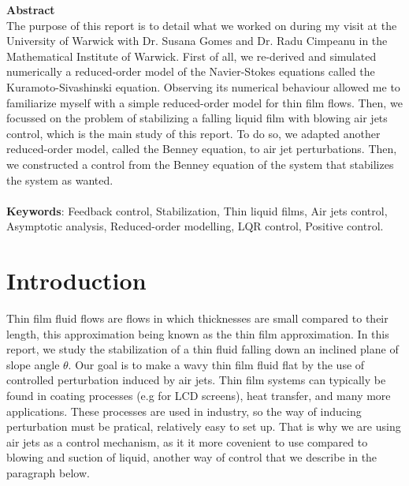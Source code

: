 \documentclass[12pt]{article}
\begin{document}
{\large \textbf{Abstract}} \\
{\normalsize The purpose of this report is to detail what we worked on during my visit at the 
University of Warwick with Dr. Susana Gomes and Dr. Radu Cimpeanu in the Mathematical Institute
 of Warwick. First of all, we re-derived and simulated numerically a reduced-order model of the 
 Navier-Stokes equations called the Kuramoto-Sivashinski equation. Observing its numerical behaviour
  allowed me to familiarize myself with a simple reduced-order model for thin film flows. Then, we 
  focussed on the problem of stabilizing a falling liquid film with blowing air jets control, 
  which is the main study of this report. To do so, we adapted another reduced-order model, called 
  the Benney equation, to air jet perturbations. Then, we constructed a control from the Benney 
  equation of the system that stabilizes the system as wanted.} \\
\vspace{0.8cm} \\
{\large \textbf{Keywords}: \normalsize Feedback control, Stabilization, Thin liquid films, Air jets control, Asymptotic analysis, Reduced-order modelling, LQR control, Positive control.}


\newpage
\tableofcontents
\newpage



\section{Introduction}\label{section_intro}
Thin film fluid flows are flows in which thicknesses are small compared to their length, this approximation being known as the
 thin film approximation. In this report, we study the stabilization of a thin fluid falling down an inclined plane of 
 slope angle $\theta$. Our goal is to make a wavy thin film fluid flat by the use of controlled perturbation 
 induced by air jets. Thin film systems can typically be found in coating processes (e.g for LCD screens), heat transfer,
  and many more applications. These processes are used in industry, so the way of inducing perturbation must be pratical, 
  relatively easy to set up. That is why we are using air jets as a control mechanism, as it it more covenient to use compared to
  blowing and suction of liquid, another way of control that we describe in the paragraph below.  \\
\end{document}
